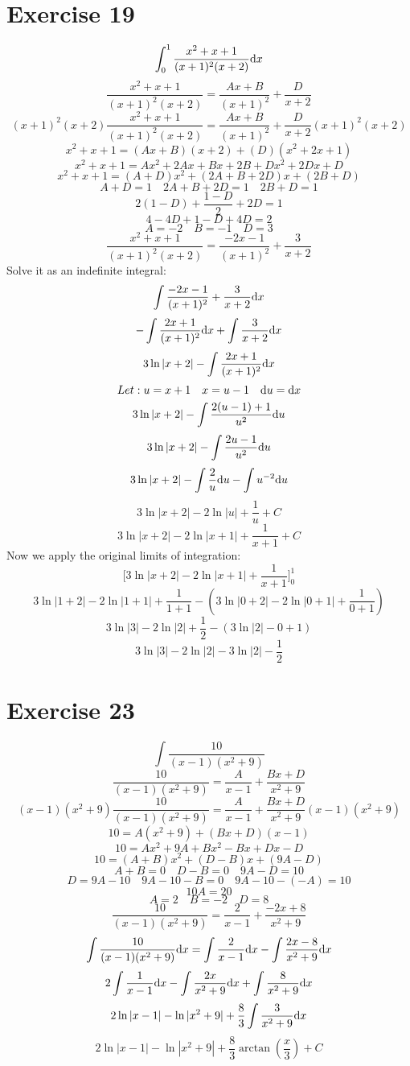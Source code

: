 \documentclass[letterpaper, 12pt]{math}
\begin{document}
\section*{Exercise 19}
\[ \int_{0}^{1}{\frac{x^{2}+x+1}{(x+1)^{2}(x+2)}\mathrm{d}{x}} \]
\[ \frac{x^{2}+x+1}{(x+1)^{2}(x+2)} = \frac{Ax+B}{(x+1)^{2}}+\frac{D}{x+2} \]
\[ (x+1)^{2}(x+2)\frac{x^{2}+x+1}{(x+1)^{2}(x+2)} =
   \frac{Ax+B}{(x+1)^{2}}+\frac{D}{x+2}(x+1)^{2}(x+2) \]
\[ x^{2}+x+1 = (Ax+B)(x+2)+(D)(x^{2}+2x+1) \]
\[ x^{2}+x+1 = Ax^{2}+2Ax+Bx+2B+Dx^{2}+2Dx+D \]
\[ x^{2}+x+1 = (A+D)x^{2}+(2A+B+2D)x+(2B+D) \]
\[ A+D = 1 \quad 2A+B+2D = 1 \quad 2B+D = 1 \]
\[ 2(1-D)+\frac{1-D}{2}+2D = 1 \]
\[ 4-4D+1-D+4D = 2 \]
\[ A = -2 \quad B = -1 \quad D = 3 \]
\[ \frac{x^{2}+x+1}{(x+1)^{2}(x+2)} = \frac{-2x-1}{(x+1)^{2}}+\frac{3}{x+2} \]
Solve it as an indefinite integral:
\[ \int{\frac{-2x-1}{(x+1)^{2}}+\frac{3}{x+2}\mathrm{d}{x}} \]
\[ -\int{\frac{2x+1}{(x+1)^{2}}\mathrm{d}{x}}+\int{\frac{3}{x+2}\mathrm{d}{x}} \]
\[ 3\ln|x+2|-\int{\frac{2x+1}{(x+1)^{2}}\mathrm{d}{x}} \]
\[ Let: u = x+1 \quad x = u-1 \quad \mathrm{d}{u}=\mathrm{d}{x} \]
\[ 3\ln|x+2|-\int{\frac{2(u-1)+1}{u^{2}}\mathrm{d}{u}} \]
\[ 3\ln|x+2|-\int{\frac{2u-1}{u^{2}}\mathrm{d}{u}} \]
\[ 3\ln|x+2|-\int{\frac{2}{u}\mathrm{d}{u}}-\int{u^{-2}\mathrm{d}{u}} \]
\[ 3\ln|x+2|-2\ln|u|+\frac{1}{u}+C \]
\[ 3\ln|x+2|-2\ln|x+1|+\frac{1}{x+1}+C \]
Now we apply the original limits of integration:
\[ \bigg[3\ln|x+2|-2\ln|x+1|+\frac{1}{x+1}\bigg]_{0}^{1} \]
\[ 3\ln|1+2|-2\ln|1+1|+\frac{1}{1+1}-(3\ln|0+2|-2\ln|0+1|+\frac{1}{0+1}) \]
\[ 3\ln|3|-2\ln|2|+\frac{1}{2}-(3\ln|2|-0+1) \]
\[ 3\ln|3|-2\ln|2|-3\ln|2|-\frac{1}{2} \]

\section*{Exercise 23}
\[ \int{\frac{10}{(x-1)(x^{2}+9)}} \]
\[ \frac{10}{(x-1)(x^{2}+9)} = \frac{A}{x-1}+\frac{Bx+D}{x^{2}+9} \]
\[ (x-1)(x^{2}+9)\frac{10}{(x-1)(x^{2}+9)} =
   \frac{A}{x-1}+\frac{Bx+D}{x^{2}+9}(x-1)(x^{2}+9) \]
\[ 10 = A(x^{2}+9)+(Bx+D)(x-1) \]
\[ 10 = Ax^{2}+9A+Bx^{2}-Bx+Dx-D \]
\[ 10 = (A+B)x^{2}+(D-B)x+(9A-D) \]
\[ A+B = 0 \quad D-B = 0 \quad 9A-D = 10 \]
\[ D = 9A-10 \quad 9A-10-B = 0 \quad 9A-10-(-A) = 10 \]
\[ 10A = 20 \]
\[ A = 2 \quad B = -2 \quad D = 8 \]
\[ \frac{10}{(x-1)(x^{2}+9)} = \frac{2}{x-1}+\frac{-2x+8}{x^{2}+9} \]
\[ \int{\frac{10}{(x-1)(x^{2}+9)}\mathrm{d}{x}} =
   \int{\frac{2}{x-1}\mathrm{d}{x}}-\int{\frac{2x-8}{x^{2}+9}\mathrm{d}{x}} \]
\[ 2\int{\frac{1}{x-1}\mathrm{d}{x}}-\int{\frac{2x}{x^{2}+9}\mathrm{d}{x}}+
   \int{\frac{8}{x^{2}+9}\mathrm{d}{x}} \]
\[ 2\ln|x-1|-\ln|x^{2}+9|+\frac{8}{3}\int{\frac{3}{x^{2}+9}\mathrm{d}{x}} \]
\[ 2\ln|x-1|-\ln|x^{2}+9|+\frac{8}{3}\arctan(\frac{x}{3})+C \]
\end{document}
